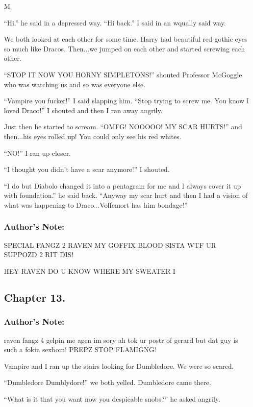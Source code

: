 M\documentclass{article}
\begin{document}
“Hi.” he said in a depressed way. “Hi back.” I said in an wqually said way.

We both looked at each other for some time. Harry had beautiful red gothic eyes so much like Dracos. Then...we jumped on each other and started screwing each other.

“STOP IT NOW YOU HORNY SIMPLETONS!” shouted Professor McGoggle who was watching us and so was everyone else.

“Vampire you fucker!” I said slapping him. “Stop trying to screw me. You know I loved Draco!” I shouted and then I ran away angrily.

Just then he started to scream. “OMFG! NOOOOO! MY SCAR HURTS!” and then...his eyes rolled up! You could only see his red whites.

“NO!” I ran up closer.

“I thought you didn’t have a scar anymore!” I shouted.

“I do but Diabolo changed it into a pentagram for me and I always cover it up with foundation.” he said back. “Anyway my scar hurt and then I had a vision of what was happening to Draco...Volfemort has him bondage!”

\nolinenumbers
\textbreak

\noindent\subsubsection*{Author's Note: }SPECIAL FANGZ 2 RAVEN MY GOFFIX BLOOD SISTA WTF UR SUPPOZD 2 RIT DIS!

\noindent
HEY RAVEN DO U KNOW WHERE MY SWEATER I

\clearpage
\subsection*{Chapter 13.}

\subsubsection*{Author's Note: }raven fangz 4 gelpin me agen im sory ah tok ur postr of gerard but dat guy is such a fokin sexbom! PREPZ STOP FLAMIGNG!

\textbreak
\linenumbers\resetlinenumber

Vampire and I ran up the stairs looking for Dumbledore. We were so scared.

“Dumbledore Dumblydore!” we both yelled. Dumbledore came there.

“What is it that you want now you despicable snobs?” he asked angrily.
\end{document}
